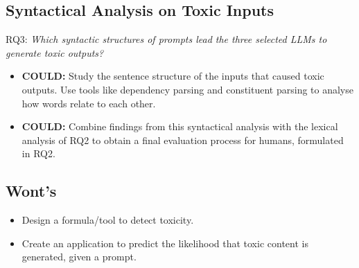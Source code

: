 \subsection{Syntactical Analysis on Toxic Inputs}
RQ3: \textit{Which syntactic structures of prompts lead the three selected LLMs to generate toxic outputs?}
\begin{itemize}
    \item \textbf{COULD:} Study the sentence structure of the inputs that caused toxic outputs. Use tools like dependency parsing and constituent parsing to analyse how words relate to each other.
    
    \item \textbf{COULD:} Combine findings from this syntactical analysis with the lexical analysis of RQ2 to obtain a final evaluation process for humans, formulated in RQ2.
\end{itemize}

\subsection{Wont's}
\begin{itemize}
    \item Design a formula/tool to detect toxicity.
    \item Create an application to predict the likelihood that toxic content is generated, given a prompt.
\end{itemize}
